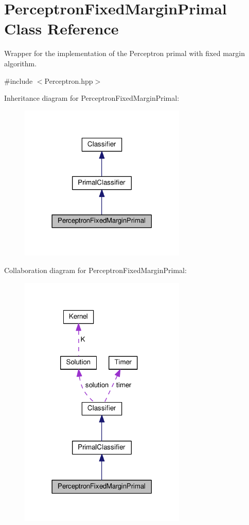 \hypertarget{class_perceptron_fixed_margin_primal}{}\section{Perceptron\+Fixed\+Margin\+Primal Class Reference}
\label{class_perceptron_fixed_margin_primal}


Wrapper for the implementation of the Perceptron primal with fixed margin algorithm.  




{\ttfamily \#include $<$Perceptron.\+hpp$>$}



Inheritance diagram for Perceptron\+Fixed\+Margin\+Primal\+:\nopagebreak
\begin{figure}[H]
\begin{center}
\leavevmode
\includegraphics[width=225pt]{class_perceptron_fixed_margin_primal__inherit__graph}
\end{center}
\end{figure}


Collaboration diagram for Perceptron\+Fixed\+Margin\+Primal\+:
\nopagebreak
\begin{figure}[H]
\begin{center}
\leavevmode
\includegraphics[width=225pt]{class_perceptron_fixed_margin_primal__coll__graph}
\end{center}
\end{figure}
